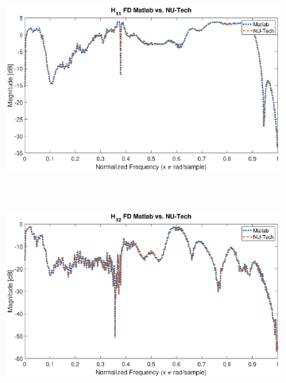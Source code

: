 \documentclass[12pt,a4paper,titlepage]{article}
\begin{document}
\begin{figure}[h]
	\centering
	\begin{subfigure}{1\textwidth}
		\includegraphics[width=1\textwidth]{Immagini/H11_FD_matlab_nutech}
		\caption{}
		\label{fig:H11_FD_matlab_nutech}
	\end{subfigure}\\
	\begin{subfigure}{1\textwidth}
			\includegraphics[width=1\textwidth]{Immagini/H12_FD_matlab_nutech}
			\caption{}
			\label{fig:H12_FD_matlab_nutech}
	\end{subfigure}
\end{figure}
\end{document}
